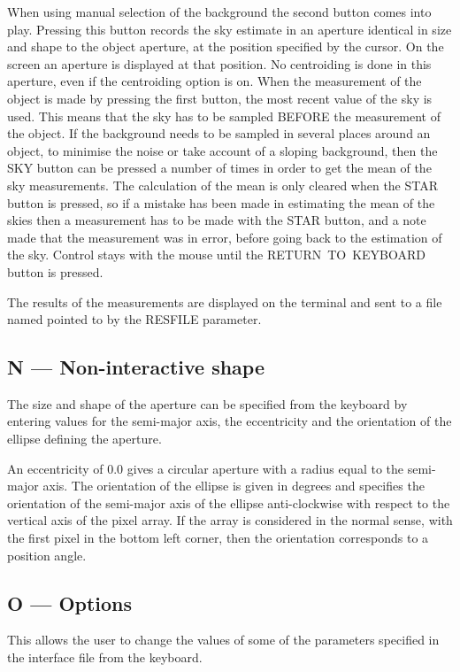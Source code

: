 When using manual selection of the background the second button comes into
play. Pressing this button records the sky estimate in an aperture
identical in size and shape to the object aperture, at the position
specified by the cursor. On the screen an aperture is displayed at that
position. No centroiding is done in this aperture, even if the centroiding
option is on. When the measurement of the object is made by pressing the
first button, the most recent value of the sky is used. This means that
the sky has to be sampled BEFORE the measurement of the object. If the
background needs to be sampled in several places around an object, to
minimise the noise or take account of a sloping background, then the
SKY button can be pressed a number of times in order to get the mean
of the sky measurements. The calculation of the mean is only cleared when
the STAR button is pressed, so if a mistake has been made in estimating
the mean of the skies then a measurement has to be made with the STAR
button, and a note made that the measurement was in error, before going
back to the estimation of the sky. Control stays with the mouse until
the RETURN~TO~KEYBOARD button is pressed.

The results of the measurements are displayed on the terminal and sent
to a file named pointed to by the RESFILE parameter.

\subsection{N --- Non-interactive shape}

The size and shape of the aperture can be specified from the keyboard
by entering values for the semi-major axis, the eccentricity and the
orientation of the ellipse defining the aperture.

An eccentricity of 0.0 gives a circular aperture with a radius equal to
the semi-major axis. The orientation of the ellipse is given in degrees
and specifies the orientation of the semi-major axis of the ellipse
anti-clockwise with respect to the vertical axis of the pixel array. If the
array is considered in the normal sense, with the first pixel in the bottom
left corner, then the orientation corresponds to a position angle.


\subsection{O --- Options}

This allows the user to change the values of some of the parameters
specified in the interface file from the keyboard.

